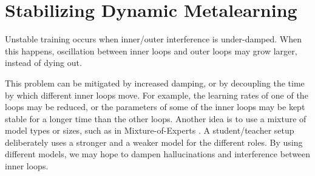     
\section{Stabilizing Dynamic Metalearning}
Unstable training occurs when inner/outer interference is under-damped. When this happens, oscillation between inner loops and outer loops may grow larger, instead of dying out. 

This problem can be mitigated by increased damping, or by decoupling the time by which different inner loops move. For example, the learning rates of one of the loops may be reduced, or the parameters of some of the inner loops may be kept stable for a longer time than the other loops. Another idea is to use a mixture of model types or sizes, such as in Mixture-of-Experts \citep{jiang2024mixtralexperts}. A student/teacher setup deliberately uses a stronger and a weaker model for the different roles. By using  different models, we may hope to dampen hallucinations and  interference between  inner loops.

